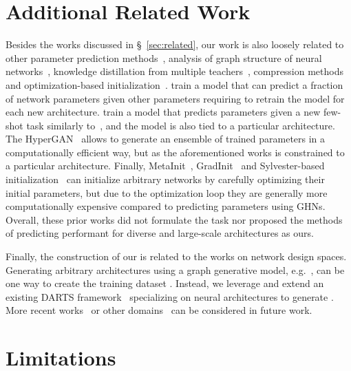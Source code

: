 \section{Additional Related Work\label{apdx:related_work}}

Besides the works discussed in \S~\ref{sec:related}, our work is also loosely related to other parameter prediction methods~\cite{Denil2013-la,bertinetto2016learning,ratzlaff2019hypergan}, analysis of graph structure of neural networks~\cite{you2020graph}, knowledge distillation from multiple teachers~\cite{liu2019knowledge}, compression methods~\cite{cheng2017survey} and optimization-based initialization~\cite{dauphin2019metainit,zhu2021gradinit,das2021data}. \citet{Denil2013-la} train a model that can predict a fraction of network parameters given other parameters requiring to retrain the model for each new architecture.
\citet{bertinetto2016learning} train a model that predicts parameters given a new few-shot task similarly to~\cite{ravi2016optimization,requeima2019fast}, and the model is also tied to a particular architecture.
The HyperGAN~\cite{ratzlaff2019hypergan} allows to generate an ensemble of trained parameters in a computationally efficient way, but as the aforementioned works is constrained to a particular architecture.
Finally, MetaInit~\cite{dauphin2019metainit}, GradInit~\cite{zhu2021gradinit} and Sylvester-based initialization~\cite{das2021data} can initialize arbitrary networks by carefully optimizing their initial parameters, but due to the optimization loop they are generally more computationally expensive compared to predicting parameters using GHNs.
Overall, these prior works did not formulate the task nor proposed the methods of predicting performant \params for diverse and large-scale architectures as ours.

Finally, the construction of our \dataset is related to the works on network design spaces. Generating arbitrary architectures using a graph generative model, e.g.~\cite{yu2019dag,guo2020systematic,you2020graph}, can be one way to create the training dataset . Instead, we leverage and extend an existing DARTS framework~\cite{liu2018darts} specializing on neural architectures to generate . 
More recent works~\cite{radosavovic2020designing} or other domains~\cite{you2020design} can be considered in future work.

\section{Limitations\label{sec:limit}}

